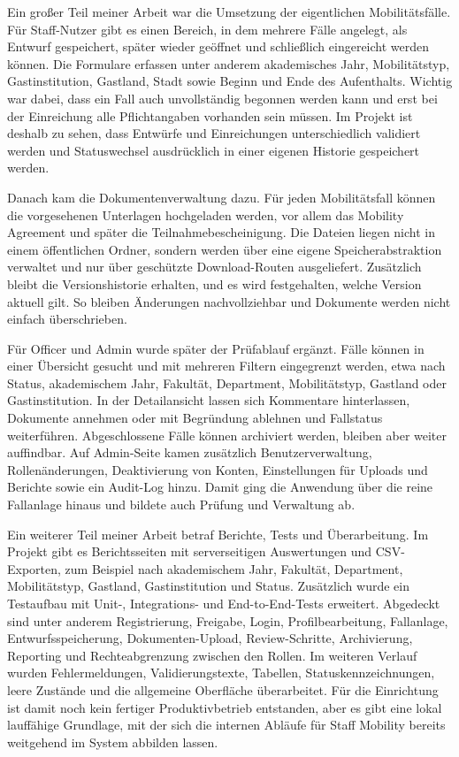 ﻿\documentclass{Vorlage}
\begin{document}
Ein großer Teil meiner Arbeit war die Umsetzung der eigentlichen Mobilitätsfälle. Für Staff-Nutzer gibt es einen Bereich, in dem mehrere Fälle angelegt, als Entwurf gespeichert, später wieder geöffnet und schließlich eingereicht werden können. Die Formulare erfassen unter anderem akademisches Jahr, Mobilitätstyp, Gastinstitution, Gastland, Stadt sowie Beginn und Ende des Aufenthalts. Wichtig war dabei, dass ein Fall auch unvollständig begonnen werden kann und erst bei der Einreichung alle Pflichtangaben vorhanden sein müssen. Im Projekt ist deshalb zu sehen, dass Entwürfe und Einreichungen unterschiedlich validiert werden und Statuswechsel ausdrücklich in einer eigenen Historie gespeichert werden.

Danach kam die Dokumentenverwaltung dazu. Für jeden Mobilitätsfall können die vorgesehenen Unterlagen hochgeladen werden, vor allem das Mobility Agreement und später die Teilnahmebescheinigung. Die Dateien liegen nicht in einem öffentlichen Ordner, sondern werden über eine eigene Speicherabstraktion verwaltet und nur über geschützte Download-Routen ausgeliefert. Zusätzlich bleibt die Versionshistorie erhalten, und es wird festgehalten, welche Version aktuell gilt. So bleiben Änderungen nachvollziehbar und Dokumente werden nicht einfach überschrieben.

Für Officer und Admin wurde später der Prüfablauf ergänzt. Fälle können in einer Übersicht gesucht und mit mehreren Filtern eingegrenzt werden, etwa nach Status, akademischem Jahr, Fakultät, Department, Mobilitätstyp, Gastland oder Gastinstitution. In der Detailansicht lassen sich Kommentare hinterlassen, Dokumente annehmen oder mit Begründung ablehnen und Fallstatus weiterführen. Abgeschlossene Fälle können archiviert werden, bleiben aber weiter auffindbar. Auf Admin-Seite kamen zusätzlich Benutzerverwaltung, Rollenänderungen, Deaktivierung von Konten, Einstellungen für Uploads und Berichte sowie ein Audit-Log hinzu. Damit ging die Anwendung über die reine Fallanlage hinaus und bildete auch Prüfung und Verwaltung ab.

Ein weiterer Teil meiner Arbeit betraf Berichte, Tests und Überarbeitung. Im Projekt gibt es Berichtsseiten mit serverseitigen Auswertungen und CSV-Exporten, zum Beispiel nach akademischem Jahr, Fakultät, Department, Mobilitätstyp, Gastland, Gastinstitution und Status. Zusätzlich wurde ein Testaufbau mit Unit-, Integrations- und End-to-End-Tests erweitert. Abgedeckt sind unter anderem Registrierung, Freigabe, Login, Profilbearbeitung, Fallanlage, Entwurfsspeicherung, Dokumenten-Upload, Review-Schritte, Archivierung, Reporting und Rechteabgrenzung zwischen den Rollen. Im weiteren Verlauf wurden Fehlermeldungen, Validierungstexte, Tabellen, Statuskennzeichnungen, leere Zustände und die allgemeine Oberfläche überarbeitet. Für die Einrichtung ist damit noch kein fertiger Produktivbetrieb entstanden, aber es gibt eine lokal lauffähige Grundlage, mit der sich die internen Abläufe für Staff Mobility bereits weitgehend im System abbilden lassen.
\end{document}
